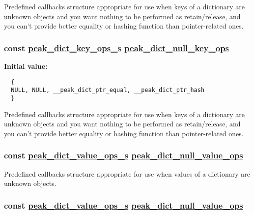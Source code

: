 Predefined callbacks structure appropriate for use when keys of a dictionary are unknown objects and you want nothing to be performed as retain/release, and you can't provide better equality or hashing function than pointer-related ones. \hypertarget{group__dict_ga5}{
\subsubsection[peak\_\-dict\_\-null\_\-key\_\-ops]{\setlength{\rightskip}{0pt plus 5cm}const \hyperlink{structpeak__dict__key__ops__s}{peak\_\-dict\_\-key\_\-ops\_\-s} \hyperlink{group__dict_ga6}{peak\_\-dict\_\-null\_\-key\_\-ops}}}
\label{group__dict_ga5}


{\bf Initial value:}

\footnotesize\begin{verbatim}
  {
  NULL, NULL, __peak_dict_ptr_equal, __peak_dict_ptr_hash
  }
\end{verbatim}\normalsize 
Predefined callbacks structure appropriate for use when keys of a dictionary are unknown objects and you want nothing to be performed as retain/release, and you can't provide better equality or hashing function than pointer-related ones. \hypertarget{group__dict_ga16}{
\subsubsection[peak\_\-dict\_\-null\_\-value\_\-ops]{\setlength{\rightskip}{0pt plus 5cm}const \hyperlink{structpeak__dict__value__ops__s}{peak\_\-dict\_\-value\_\-ops\_\-s} \hyperlink{group__dict_ga16}{peak\_\-dict\_\-null\_\-value\_\-ops}}}
\label{group__dict_ga16}


Predefined callbacks structure appropriate for use when values of a dictionary are unknown objects. \hypertarget{group__dict_ga15}{
\subsubsection[peak\_\-dict\_\-null\_\-value\_\-ops]{\setlength{\rightskip}{0pt plus 5cm}const \hyperlink{structpeak__dict__value__ops__s}{peak\_\-dict\_\-value\_\-ops\_\-s} \hyperlink{group__dict_ga16}{peak\_\-dict\_\-null\_\-value\_\-ops}}}
\label{group__dict_ga15}


